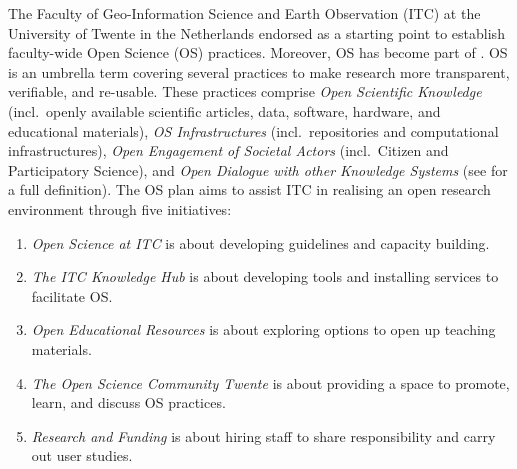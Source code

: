 \documentclass[gc, manuscript]{copernicus}
\providecommand{\tightlist}{%
  \setlength{\itemsep}{0pt}\setlength{\parskip}{0pt}}
\begin{document}
The Faculty of Geo-Information Science and Earth Observation (ITC) at
the University of Twente in the Netherlands endorsed
\href{https://doi.org/10.5281/zenodo.5113578}{\color{blue}{ITC’s Strategic Plan for Open Science 2021-2025 - Towards an Open Future}}
\citep{konkol2021itc} as a starting point to establish faculty-wide Open
Science (OS) practices. Moreover, OS has become part of
\href{https://www.itc.nl/about-itc/itc-mission-and-vision-2020-2030.pdf}{\color{blue}{ITC’s mission and vision}}.
OS is an umbrella term covering several practices to make research more
transparent, verifiable, and re-usable. These practices comprise
\textit{Open Scientific Knowledge} (incl.~openly available scientific
articles, data, software, hardware, and educational materials),
\textit{OS Infrastructures} (incl.~repositories and computational
infrastructures), \textit{Open Engagement of Societal Actors}
(incl.~Citizen and Participatory Science), and
\textit{Open Dialogue with other Knowledge Systems} (see
\href{https://en.unesco.org/science-sustainable-future/open-science/recommendation}{\color{blue}{UNESCO's Recommendation on OS}}
\citep{unesco} for a full definition). The OS plan aims to assist ITC in
realising an open research environment through five initiatives:

\begin{enumerate}
\def\labelenumi{\arabic{enumi}.}
\tightlist
\item
  \textit{Open Science at ITC} is about developing guidelines and
  capacity building.
\item
  \textit{The ITC Knowledge Hub} is about developing tools and
  installing services to facilitate OS.
\item
  \textit{Open Educational Resources} is about exploring options to open
  up teaching materials.
\item
  \textit{The Open Science Community Twente} is about providing a space
  to promote, learn, and discuss OS practices.
\item
  \textit{Research and Funding} is about hiring staff to share
  responsibility and carry out user studies.
\end{enumerate}
\end{document}
